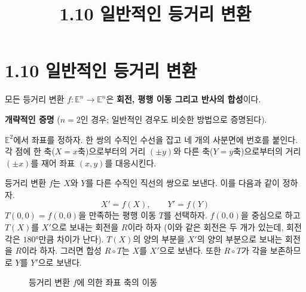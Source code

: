 \documentclass{article}
\title{1.10 일반적인 등거리 변환}
\date{}
\author{}
\begin{document}
\maketitle

\section*{1.10 일반적인 등거리 변환}

\begin{tcolorbox}[
  colback=red!4, colframe=red!60!black,
  title=정리 1.10.1,
  fonttitle=\bfseries, boxrule=0.5mm, arc=3mm]

모든 등거리 변환 $f : \mathbb{E}^n \to \mathbb{E}^n$은
\textbf{회전, 평행 이동 그리고 반사의 합성}이다.

\end{tcolorbox}

\textbf{개략적인 증명} ($n = 2$인 경우; 일반적인 경우도 비슷한 방법으로 증명된다).

$\mathbb{E}^2$에서 좌표를 정하자.
한 쌍의 수직인 수선을 잡고 네 개의 사분면에 번호를 붙인다.
각 점에 한 축($X = x$축)으로부터의 거리 $(\pm y)$와 다른 축($Y = y$축)으로부터의 거리 $(\pm x)$를 재어 좌표 $(x,y)$를 대응시킨다.

등거리 변환 $f$는 $X$와 $Y$를 다른 수직인 직선의 쌍으로 보낸다. 이를 다음과 같이 정하자.
\[
  X' = f(X), \qquad Y' = f(Y)
\]
$T(0,0) = f(0,0)$을 만족하는 평행 이동 $T$를 선택하자.
$f(0,0)$을 중심으로 하고 $T(X)$를 $X'$으로 보내는 회전을 $R$이라 하자
(이와 같은 회전은 두 개가 있는데, 회전각은 $180°$만큼 차이가 난다).
$T(X)$의 양의 부분을 $X'$의 양의 부분으로 보내는 회전을 $R$이라 하자.
그러면 합성 $R \circ T$는 $X$를 $X'$으로 보낸다.
또한 $R \circ T$가 각을 보존하므로 $Y$를 $Y'$으로 보낸다.

\begin{figure}[h]
\centering
{}
\caption{등거리 변환 $f$에 의한 좌표 축의 이동}
\label{fig:1.51}
\end{figure}
\end{document}
